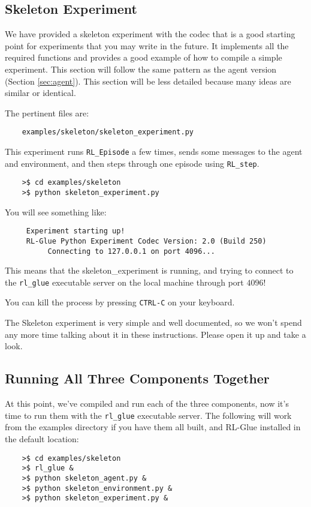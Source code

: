 \documentclass[11pt]{article}
\begin{document}
\subsection{Skeleton Experiment}
We have provided a skeleton experiment with the codec that is a good starting point for experiments that you may write in the future.
It implements all the required functions and provides a good example of how to compile a simple experiment.  This section will follow the same 
pattern as the agent version (Section \ref{sec:agent}).  This section will be less detailed because many ideas are similar or identical.

The pertinent files are:
\begin{verbatim}
	examples/skeleton/skeleton_experiment.py
\end{verbatim}

This experiment runs \texttt{RL\_Episode} a few times, sends some messages to the agent and environment, and then steps through one episode using \texttt{RL\_step}.

\begin{verbatim}
	>$ cd examples/skeleton
	>$ python skeleton_experiment.py
\end{verbatim}

You will see something like:
\begin{verbatim}
     Experiment starting up!
     RL-Glue Python Experiment Codec Version: 2.0 (Build 250)
          Connecting to 127.0.0.1 on port 4096...
\end{verbatim}

This means that the skeleton\_experiment is running, and trying to connect to the \texttt{rl\_glue} executable server on the local machine through port $4096$!  

You can kill the process by pressing \texttt{CTRL-C} on your keyboard.


The Skeleton experiment is very simple and well documented, so we won't spend any more time talking about it in these instructions.
Please open it up and take a look.

\subsection{Running All Three Components Together}
At this point, we've compiled and run each of the three components, now it's time to run them with the \texttt{rl\_glue} executable server.  The following will work from the examples 
directory if you have them all built, and RL-Glue installed in the default location:
\begin{verbatim}
	>$ cd examples/skeleton
	>$ rl_glue &
	>$ python skeleton_agent.py &
	>$ python skeleton_environment.py &
	>$ python skeleton_experiment.py &
\end{verbatim}
\end{document}
